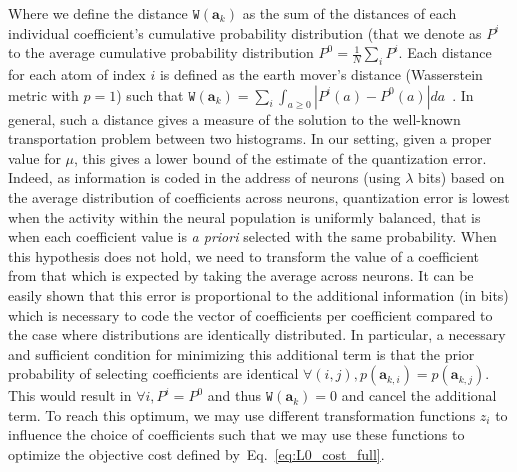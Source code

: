 \documentclass[vision,article,submit,oneauthor,pdftex]{Definitions/mdpi}
\newcommand{\coef}{\mathbf{a}} %
\newcommand{\image}{\mathbf{y}} %
\newcommand{\seeEq}[1]{Eq.~\ref{eq:#1}}%
\begin{document}
Where we define the distance $\texttt{W}(\coef_{k})$ as the sum of the distances of each individual coefficient's cumulative probability distribution (that we denote as $P^i$ to the average cumulative probability distribution $P^0 = \frac 1 N \sum_i P^i$. Each distance for each atom of index $i$ is defined as the earth mover's distance (Wasserstein metric with $p=1$) such that  $ \texttt{W}(\coef_{k}) = \sum_i \int_{a\geq0} | P^i(a) - P^0(a)| da $~\citep{Vallender74}. In general, such a distance gives a measure of the solution to the well-known transportation problem between two histograms. In our setting, given a proper value for $\mu$, this gives a lower bound of the estimate of the quantization error.  Indeed, as information is coded in the address of neurons (using $\lambda$ bits) based on the average distribution of coefficients across neurons, quantization error is lowest when the activity within the neural population is uniformly balanced, that is when each coefficient value is \emph{a priori} selected with the same probability. When this hypothesis does not hold, we need to transform the value of a coefficient from that which is expected by taking the average across neurons. It can be easily shown that this error is proportional to the additional information (in bits) which is necessary to code the vector of coefficients per coefficient compared to the case where distributions are identically distributed. In particular, a necessary and sufficient condition for minimizing this additional term is that the prior probability of selecting coefficients are identical $\forall (i,j), p(\coef_{k,i})=p(\coef_{k,j})$. This would result in $\forall i, P^i = P^0$ and thus $\texttt{W}(\coef_{k})= 0$ and cancel the additional term. To reach this optimum, we may use different transformation functions $z_i$ to influence the choice of coefficients such that we may use these functions to optimize the objective cost defined by~\seeEq{L0_cost_full}.
\end{document}
